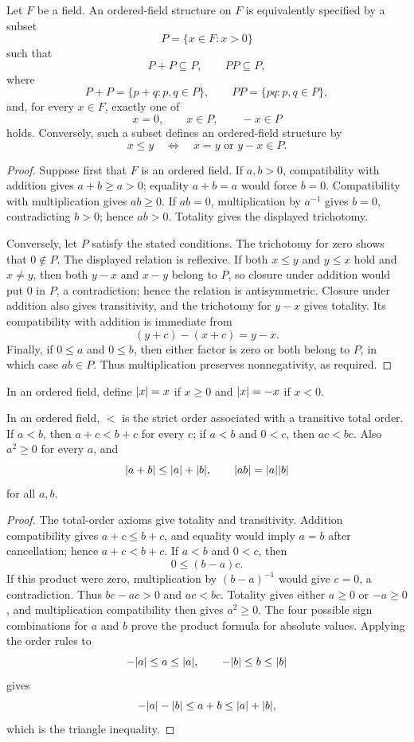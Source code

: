 \begin{proposition}
\label{prop:positive-cone-characterization}
Let $F$ be a field. An ordered-field structure on $F$ is equivalently
specified by a subset
\[
P=\{x\in F:x>0\}
\]
such that
\[
P+P\subseteq P,
\qquad
PP\subseteq P,
\]
where
\[
P+P=\{p+q:p,q\in P\},
\qquad
PP=\{pq:p,q\in P\},
\]
and, for every $x\in F$, exactly one of
\[
x=0,
\qquad
x\in P,
\qquad
-x\in P
\]
holds. Conversely, such a subset defines an ordered-field structure by
\[
x\leq y
\quad\Longleftrightarrow\quad
x=y\text{ or }y-x\in P.
\]
\end{proposition}
\begin{proof}
Suppose first that $F$ is an ordered field. If $a,b>0$, compatibility with
addition gives $a+b\geq a>0$; equality $a+b=a$ would force $b=0$.
Compatibility with multiplication gives
\(ab\geq0\). If $ab=0$, multiplication by $a^{-1}$ gives $b=0$,
contradicting $b>0$; hence \(ab>0\). Totality gives the displayed
trichotomy.

Conversely, let $P$ satisfy the stated conditions. The trichotomy for zero
shows that $0\notin P$. The displayed relation is reflexive. If both
\(x\leq y\) and \(y\leq x\) hold and $x\ne y$, then both $y-x$ and
\(x-y\) belong to $P$, so closure under addition would put $0$ in $P$, a
contradiction; hence the relation is antisymmetric. Closure under addition
also gives transitivity, and the trichotomy for $y-x$ gives totality. Its
compatibility with addition is immediate from
\[
(y+c)-(x+c)=y-x.
\]
Finally, if $0\leq a$ and $0\leq b$, then either factor is zero or both
belong to $P$, in which case $ab\in P$. Thus multiplication preserves
nonnegativity, as required.
\end{proof}

\begin{definition}
In an ordered field, define $\lvert x\rvert=x$ if $x\geq0$ and $\lvert x\rvert=-x$ if $x<0$.
\end{definition}

\begin{proposition}
\label{prop:ordered-field-rules}
In an ordered field, $<$ is the strict order associated with a transitive
total order. If $a<b$, then $a+c<b+c$ for every $c$; if $a<b$ and $0<c$, then $ac<bc$. Also $a^2\geq0$ for every $a$, and
\[
\lvert a+b\rvert\leq\lvert a\rvert+\lvert b\rvert,\qquad \lvert ab\rvert=\lvert a\rvert\lvert b\rvert
\]
for all $a,b$.
\end{proposition}
\begin{proof}
The total-order axioms give totality and transitivity. Addition compatibility
gives $a+c\leq b+c$, and equality would imply $a=b$ after cancellation;
hence $a+c<b+c$. If $a<b$ and $0<c$, then
\[
0\leq(b-a)c.
\]
If this product were zero, multiplication by $(b-a)^{-1}$ would give
\(c=0\), a contradiction. Thus $bc-ac>0$ and $ac<bc$. Totality gives either
$a\geq0$ or $-a\geq0$, and multiplication compatibility then gives
$a^2\geq0$. The four possible sign combinations for $a$ and $b$ prove the
product formula for absolute values. Applying the order rules to
\[
-\lvert a\rvert\leq a\leq\lvert a\rvert,\qquad -\lvert b\rvert\leq b\leq\lvert b\rvert
\]
gives
\[
-\lvert a\rvert-\lvert b\rvert\leq a+b\leq\lvert a\rvert+\lvert b\rvert,
\]
which is the triangle inequality.
\end{proof}

